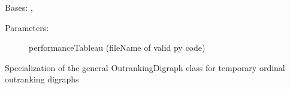 \documentclass[letterpaper,10pt,english]{sphinxmanual}
\begin{document}
\begin{fulllineitems}
\label{techDoc:outrankingDigraphs.OrdinalOutrankingDigraph}
Bases: {\hyperref[techDoc:outrankingDigraphs.OutrankingDigraph]{}}, {\hyperref[techDoc:perfTabs.PerformanceTableau]{}}
\begin{description}
\item[{Parameters:}] \leavevmode
performanceTableau (fileName of valid py code)

\end{description}

Specialization of the general OutrankingDigraph class for 
temporary ordinal outranking digraphs

\end{fulllineitems}

\end{document}
